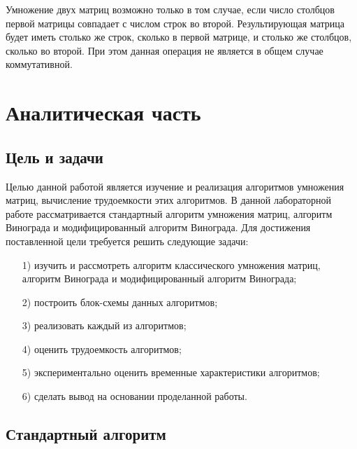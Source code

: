 \documentclass[12pt]{report}
\begin{document}
Умножение двух матриц возможно только в том случае, если число столбцов первой матрицы совпадает с числом строк во второй. Результирующая матрица будет иметь столько же строк, сколько в первой матрице, и столько же столбцов, сколько во второй. При этом данная операция не является в общем случае коммутативной.

	
	\chapter{Аналитическая часть}
	
	\section{Цель и задачи}
	
	Целью данной работой является изучение и реализация алгоритмов умножения матриц, вычисление трудоемкости этих алгоритмов. В данной лабораторной работе рассматривается стандартный алгоритм умножения матриц, алгоритм Винограда и модифицированный алгоритм Винограда. Для достижения поставленной цели требуется решить следующие задачи:
	
	\begin{enumerate}
		\item[1)] изучить и рассмотреть алгоритм классического умножения матриц, алгоритм Винограда и модифицированный алгоритм Винограда; 
		\item[2)] построить блок-схемы данных алгоритмов;
		\item[3)] реализовать каждый из алгоритмов;
		\item[4)] оценить трудоемкость алгоритмов;
		\item[5)] экспериментально оценить временные характеристики алгоритмов;
		\item[6)] сделать вывод на основании проделанной работы.
	\end{enumerate}
	
	
	\section{Стандартный алгоритм}
	
\end{document}
